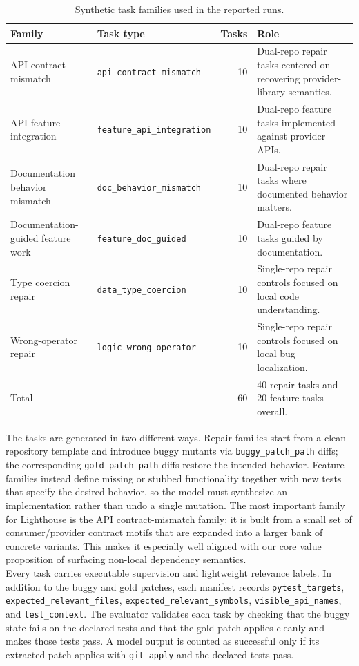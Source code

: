 \documentclass[a4paper,12pt]{article}
\begin{document}
\begin{table}[t]
\centering
\small
\caption{Synthetic task families used in the reported runs.}
\label{tab:synthetic-family-summary}
\begin{tabular}{l l r p{5.1cm}}
\hline
Family & Task type & Tasks & Role \\
\hline
API contract mismatch & \texttt{api\_contract\_mismatch} & 10 & Dual-repo repair tasks centered on recovering provider-library semantics. \\
API feature integration & \texttt{feature\_api\_integration} & 10 & Dual-repo feature tasks implemented against provider APIs. \\
Documentation behavior mismatch & \texttt{doc\_behavior\_mismatch} & 10 & Dual-repo repair tasks where documented behavior matters. \\
Documentation-guided feature work & \texttt{feature\_doc\_guided} & 10 & Dual-repo feature tasks guided by documentation. \\
Type coercion repair & \texttt{data\_type\_coercion} & 10 & Single-repo repair controls focused on local code understanding. \\
Wrong-operator repair & \texttt{logic\_wrong\_operator} & 10 & Single-repo repair controls focused on local bug localization. \\
\hline
Total & --- & 60 & 40 repair tasks and 20 feature tasks overall. \\
\hline
\end{tabular}
\end{table}

The tasks are generated in two different ways. Repair families start from a clean repository template and introduce buggy mutants via \texttt{buggy\_patch\_path} diffs; the corresponding \texttt{gold\_patch\_path} diffs restore the intended behavior. Feature families instead define missing or stubbed functionality together with new tests that specify the desired behavior, so the model must synthesize an implementation rather than undo a single mutation. The most important family for Lighthouse is the API contract-mismatch family: it is built from a small set of consumer/provider contract motifs that are expanded into a larger bank of concrete variants. This makes it especially well aligned with our core value proposition of surfacing non-local dependency semantics.\\

Every task carries executable supervision and lightweight relevance labels. In addition to the buggy and gold patches, each manifest records \texttt{pytest\_targets}, \texttt{expected\_relevant\_files}, \texttt{expected\_relevant\_symbols}, \texttt{visible\_api\_names}, and \texttt{test\_context}. The evaluator validates each task by checking that the buggy state fails on the declared tests and that the gold patch applies cleanly and makes those tests pass. A model output is counted as successful only if its extracted patch applies with \texttt{git apply} and the declared tests pass.\\
\end{document}
